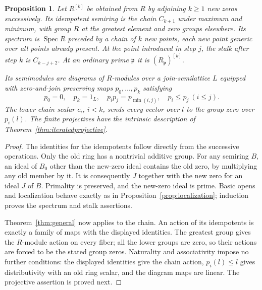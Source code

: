 \documentclass[11pt]{amsart}
\DeclareMathOperator{\Spec}{Spec}
\newtheorem{proposition}[theorem]{Proposition}
\theoremstyle{definition}
\theoremstyle{remark}
\begin{document}
\begin{proposition}\label{prop:iterated}
Let $R^{[k]}$ be obtained from $R$ by adjoining $k\ge1$ new zeros successively. Its idempotent semiring is the chain $C_{k+1}$ under maximum and minimum, with group $R$ at the greatest element and zero groups elsewhere. Its spectrum is $\Spec R$ preceded by a chain of $k$ new points, each new point generic over all points already present. At the point introduced in step $j$, the stalk after step $k$ is $C_{k-j+2}$. At an ordinary prime $\mathfrak p$ it is $(R_{\mathfrak p})^{[k]}$.

Its semimodules are diagrams of $R$-modules over a join-semilattice $L$ equipped with zero-and-join preserving maps $p_0,\ldots,p_k$ satisfying
\[
 p_0=0,\quad p_k=1_L,\quad p_i p_j=p_{\min(i,j)},\quad p_i\le p_j\ (i\le j).
\]
The lower chain scalar $c_i$, $i<k$, sends every vector over $l$ to the group zero over $p_i(l)$. The finite projectives have the intrinsic description of Theorem~\ref{thm:iteratedprojective}.
\end{proposition}
\begin{proof}
The identities for the idempotents follow directly from the successive operations. Only the old ring has a nontrivial additive group. For any semiring $B$, an ideal of $B_0$ other than the new-zero ideal contains the old zero, by multiplying any old member by it. It is consequently $J$ together with the new zero for an ideal $J$ of $B$. Primality is preserved, and the new-zero ideal is prime. Basic opens and localization behave exactly as in Proposition~\ref{prop:localization}; induction proves the spectrum and stalk assertions.

Theorem~\ref{thm:general} now applies to the chain. An action of its idempotents is exactly a family of maps with the displayed identities. The greatest group gives the $R$-module action on every fiber; all the lower groups are zero, so their actions are forced to be the stated group zeros. Naturality and associativity impose no further conditions: the displayed identities give the chain action, $p_i(l)\le l$ gives distributivity with an old ring scalar, and the diagram maps are linear. The projective assertion is proved next.
\end{proof}
\end{document}
